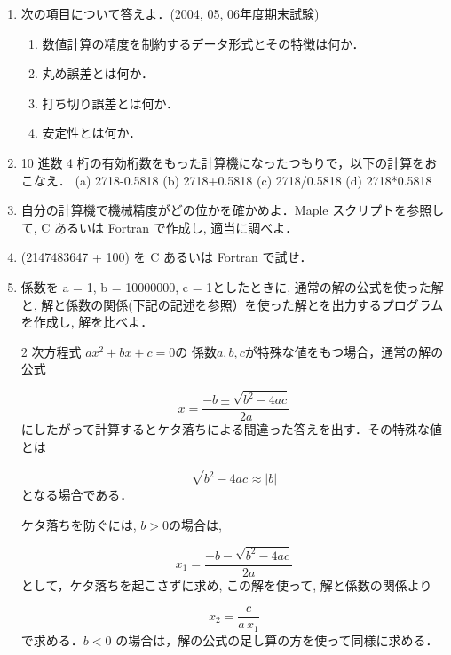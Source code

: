 \begin{enumerate}
\item 次の項目について答えよ．(2004, 05, 06年度期末試験)
\begin{enumerate}
\item 数値計算の精度を制約するデータ形式とその特徴は何か．
\item 丸め誤差とは何か．
\item 打ち切り誤差とは何か．
\item 安定性とは何か．
\end{enumerate}
\item 10 進数 4 桁の有効桁数をもった計算機になったつもりで，以下の計算をおこなえ． 
 (a) 2718-0.5818 (b) 2718+0.5818 (c)  2718/0.5818 (d) 2718*0.5818
\item 自分の計算機で機械精度がどの位かを確かめよ．Maple スクリプトを参照して, C あるいは Fortran で作成し, 適当に調べよ．
\item (2147483647 + 100) を C あるいは Fortran で試せ．
\item 係数を a = 1,  b = 10000000,  c = 1としたときに, 通常の解の公式を使った解と, 解と係数の関係(下記の記述を参照）を使った解とを出力するプログラムを作成し, 解を比べよ．

2 次方程式 $ax^2+bx+c=0$の
係数$a, b, c$が特殊な値をもつ場合，通常の解の公式 

\begin{equation*}
x = \frac {-b \pm \sqrt{{b}^{2}-4ac}}{2a}
\end{equation*}
にしたがって計算するとケタ落ちによる間違った答えを出す．その特殊な値とは

\begin{equation*}
\sqrt{{b}^{2}-4ac} \approx |b|
\end{equation*}
となる場合である．

ケタ落ちを防ぐには, $b > 0$の場合は,  

\begin{equation*}
x_1 = \frac {-b - \sqrt{{b}^{2}-4ac}}{2a}
\end{equation*}
として，ケタ落ちを起こさずに求め, この解を使って, 解と係数の関係より

\begin{equation*}
x_2 = \frac {c}{a\,  x_1}
\end{equation*}
で求める．$b < 0$ の場合は，解の公式の足し算の方を使って同様に求める．

\end{enumerate}

